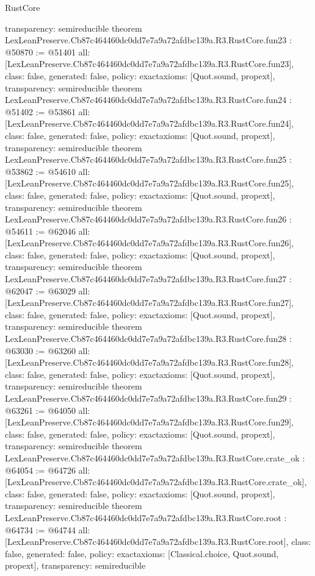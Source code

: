 \begin{lexlean}{RustCore}
\begin{coremodule}
{  transparency: semireducible
}
theorem LexLeanPreserve.Cb87c464460dc0dd7e7a9a72afdbc139a.R3.RustCore.fun23 : @50870 := @51401 {
  all: [LexLeanPreserve.Cb87c464460dc0dd7e7a9a72afdbc139a.R3.RustCore.fun23],
  class: false,
  generated: false,
  policy: exact{axioms: [Quot.sound, propext]},
  transparency: semireducible
}
theorem LexLeanPreserve.Cb87c464460dc0dd7e7a9a72afdbc139a.R3.RustCore.fun24 : @51402 := @53861 {
  all: [LexLeanPreserve.Cb87c464460dc0dd7e7a9a72afdbc139a.R3.RustCore.fun24],
  class: false,
  generated: false,
  policy: exact{axioms: [Quot.sound, propext]},
  transparency: semireducible
}
theorem LexLeanPreserve.Cb87c464460dc0dd7e7a9a72afdbc139a.R3.RustCore.fun25 : @53862 := @54610 {
  all: [LexLeanPreserve.Cb87c464460dc0dd7e7a9a72afdbc139a.R3.RustCore.fun25],
  class: false,
  generated: false,
  policy: exact{axioms: [Quot.sound, propext]},
  transparency: semireducible
}
theorem LexLeanPreserve.Cb87c464460dc0dd7e7a9a72afdbc139a.R3.RustCore.fun26 : @54611 := @62046 {
  all: [LexLeanPreserve.Cb87c464460dc0dd7e7a9a72afdbc139a.R3.RustCore.fun26],
  class: false,
  generated: false,
  policy: exact{axioms: [Quot.sound, propext]},
  transparency: semireducible
}
theorem LexLeanPreserve.Cb87c464460dc0dd7e7a9a72afdbc139a.R3.RustCore.fun27 : @62047 := @63029 {
  all: [LexLeanPreserve.Cb87c464460dc0dd7e7a9a72afdbc139a.R3.RustCore.fun27],
  class: false,
  generated: false,
  policy: exact{axioms: [Quot.sound, propext]},
  transparency: semireducible
}
theorem LexLeanPreserve.Cb87c464460dc0dd7e7a9a72afdbc139a.R3.RustCore.fun28 : @63030 := @63260 {
  all: [LexLeanPreserve.Cb87c464460dc0dd7e7a9a72afdbc139a.R3.RustCore.fun28],
  class: false,
  generated: false,
  policy: exact{axioms: [Quot.sound, propext]},
  transparency: semireducible
}
theorem LexLeanPreserve.Cb87c464460dc0dd7e7a9a72afdbc139a.R3.RustCore.fun29 : @63261 := @64050 {
  all: [LexLeanPreserve.Cb87c464460dc0dd7e7a9a72afdbc139a.R3.RustCore.fun29],
  class: false,
  generated: false,
  policy: exact{axioms: [Quot.sound, propext]},
  transparency: semireducible
}
theorem LexLeanPreserve.Cb87c464460dc0dd7e7a9a72afdbc139a.R3.RustCore.crate_ok : @64054 := @64726 {
  all: [LexLeanPreserve.Cb87c464460dc0dd7e7a9a72afdbc139a.R3.RustCore.crate_ok],
  class: false,
  generated: false,
  policy: exact{axioms: [Quot.sound, propext]},
  transparency: semireducible
}
theorem LexLeanPreserve.Cb87c464460dc0dd7e7a9a72afdbc139a.R3.RustCore.root : @64734 := @64744 {
  all: [LexLeanPreserve.Cb87c464460dc0dd7e7a9a72afdbc139a.R3.RustCore.root],
  class: false,
  generated: false,
  policy: exact{axioms: [Classical.choice, Quot.sound, propext]},
  transparency: semireducible
}


\end{coremodule}
\end{lexlean}
